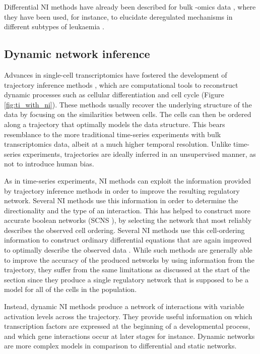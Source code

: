 Differential NI methods have already been described for bulk -omics data \cite{Ideker2012}, where they have been used, for instance, to elucidate deregulated mechanisms in different subtypes of leukaemia \cite{Gill2014}.

\subsection{Dynamic network inference}
Advances in single-cell transcriptomics have fostered the development of trajectory inference methods \cite{Cannoodt2016}, which are computational tools to reconstruct dynamic processes such as cellular differentiation and cell cycle (Figure \ref{fig:ti_with_ni}). These methods usually recover the underlying structure of the data by focusing on the similarities between cells. The cells can then be ordered along a trajectory that optimally models the data structure.  
This bears resemblance to the more traditional time-series experiments with bulk transcriptomics data, albeit at a much higher temporal resolution. Unlike time-series experiments, trajectories are ideally inferred in an unsupervised manner, as not to introduce human bias.

As in time-series experiments, NI methods can exploit the information provided by trajectory inference methods in order to improve the resulting regulatory network. Several NI methods use this information in order to determine the directionality and the type of an interaction. This has helped to construct more accurate boolean networks (SCNS \cite{Moignard2015}), by selecting the network that most reliably describes the observed cell ordering. Several NI methods use this cell-ordering information to construct ordinary differential equations that are again improved to optimally describe the observed data \cite{Ocone2015,Wei2016}. While such methods are generally able to improve the accuracy of the produced networks by using information from the trajectory, they suffer from the same limitations as discussed at the start of the section since they produce a single regulatory network that is supposed to be a model for all of the cells in the population.

Instead, dynamic NI methods produce a network of interactions with variable activation levels across the trajectory. They provide useful information on which transcription factors are expressed at the beginning of a developmental process, and which gene interactions occur at later stages for instance. Dynamic networks are more complex models in comparison to differential and static networks. 


